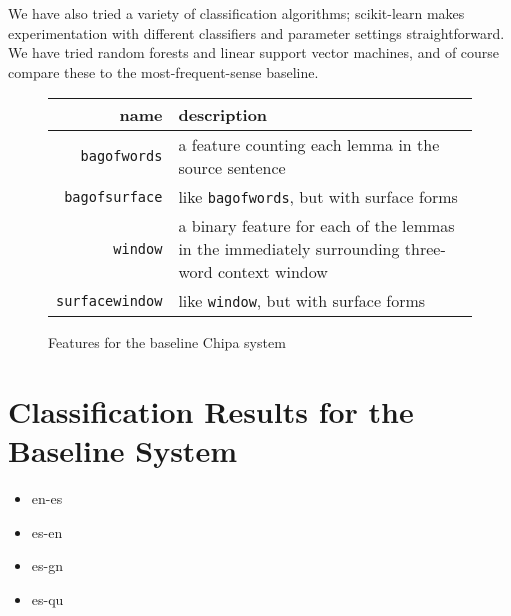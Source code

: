 
We have also tried a variety of classification algorithms; scikit-learn makes
experimentation with different classifiers and parameter settings
straightforward. We have tried random forests and linear support vector
machines, and of course compare these to the most-frequent-sense baseline.


\begin{figure*}
  \begin{centering}
  \begin{tabular}{|r|p{11cm}|}
    \hline
    name          & description  \\
    \hline
    \texttt{bagofwords}    & a feature counting each lemma in the source sentence \\
    \hline
    \texttt{bagofsurface}  & like \texttt{bagofwords}, but with surface forms \\
    \hline
    \texttt{window}       & a binary feature for each of the lemmas in the immediately surrounding three-word context window \\
    \hline
    \texttt{surfacewindow} & like \texttt{window}, but with surface forms \\
    \hline
  \end{tabular}
  \end{centering}
  \caption{Features for the baseline Chipa system}
  \label{fig:baselinefeatures}
\end{figure*}

\section{Classification Results for the Baseline System}


\begin{itemize}
\item en-es
\item es-en
\item es-gn
\item es-qu
\end{itemize}

